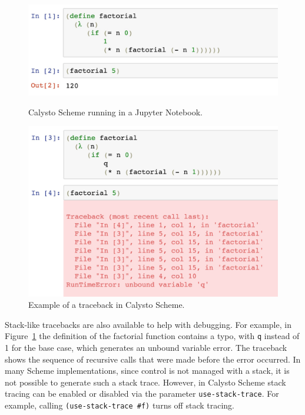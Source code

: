 \documentclass[acmsmall,screen,authorversion]{acmart}
\begin{document}

\begin{figure}[h]
\begin{minipage}{0.47\textwidth}
  \includegraphics[width=\textwidth]{factorial1.jpg}
  \caption{Calysto Scheme running in a Jupyter Notebook.}
  \label{fig:fact1}
\end{minipage}
\hspace{0.2in}
\begin{minipage}{0.47\textwidth}
  \includegraphics[width=\textwidth]{factorial2.jpg}
  \caption{Example of a traceback in Calysto Scheme.}
  \label{fig:fact2}
\end{minipage}
\end{figure}


Stack-like tracebacks are also available to help with debugging. For example,
in Figure~\ref{fig:fact2} the definition of the factorial function contains a
typo, with \texttt{q} instead of 1 for the base case, which generates an
unbound variable error. The traceback shows the sequence of recursive calls
that were made before the error occurred. In many Scheme implementations, since
control is not managed with a stack, it is not possible to generate such a
stack trace. However, in Calysto Scheme stack tracing can be enabled or
disabled via the parameter \texttt{use-stack-trace}. For example, calling
\texttt{(use-stack-trace~\#f)} turns off stack tracing.
\end{document}
